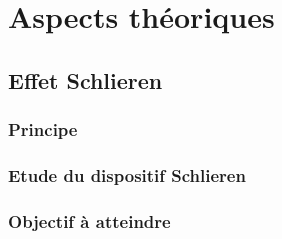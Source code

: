 \renewcommand{\chaptername}{\scshape Partie}
\chapter{Aspects théoriques}
\section{Effet Schlieren}
\subsection{Principe}
\subsection{Etude du dispositif Schlieren}
\subsection{Objectif à atteindre}